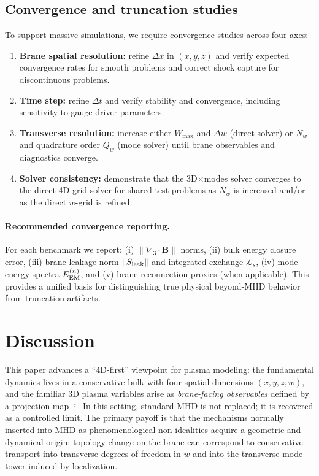 \documentclass[11pt]{article}
\newcommand{\gradthree}{\nabla_3}
\newcommand{\Proj}[1]{\overline{#1}} %
\newcommand{\B}{\mathbf{B}}
\newcommand{\Sleak}{S_{\rm leak}}
\begin{document}
\subsection{Convergence and truncation studies}
\label{sec:validation_convergence}

To support massive simulations, we require convergence studies across four axes:
\begin{enumerate}[leftmargin=1.6em]
\item \textbf{Brane spatial resolution:} refine \(\Delta x\) in \((x,y,z)\) and verify
expected convergence rates for smooth problems and correct shock capture for
discontinuous problems.
\item \textbf{Time step:} refine \(\Delta t\) and verify stability and convergence,
including sensitivity to gauge-driver parameters.
\item \textbf{Transverse resolution:} increase either \(W_{\max}\) and \(\Delta w\)
(direct solver) or \(N_w\) and quadrature order \(Q_w\) (mode solver) until brane
observables and diagnostics converge.
\item \textbf{Solver consistency:} demonstrate that the 3D\(\times\)modes solver
converges to the direct 4D-grid solver for shared test problems as \(N_w\) is
increased and/or as the direct \(w\)-grid is refined.
\end{enumerate}

\paragraph{Recommended convergence reporting.}
For each benchmark we report:
(i) \(\|\gradthree\cdot\B\|\) norms, (ii) bulk energy closure error,
(iii) brane leakage norm \(\|\Sleak\|\) and integrated exchange \(\mathcal{L}_s\),
(iv) mode-energy spectra \(E_{\rm EM}^{(n)}\), and (v) brane reconnection proxies
(when applicable). This provides a unified basis for distinguishing true physical
beyond-MHD behavior from truncation artifacts.

\section{Discussion}
\label{sec:discussion}

This paper advances a ``4D-first'' viewpoint for plasma modeling: the fundamental
dynamics lives in a conservative bulk with four spatial dimensions \((x,y,z,w)\),
and the familiar \(3\)D plasma variables arise as \emph{brane-facing observables}
defined by a projection map \(\Proj{\cdot}\). In this setting, standard MHD is not
replaced; it is recovered as a controlled limit. The primary payoff is that the
mechanisms normally inserted into MHD as phenomenological non-idealities acquire a
geometric and dynamical origin: topology change on the brane can correspond to
conservative transport into transverse degrees of freedom in \(w\) and into the
transverse mode tower induced by localization.
\end{document}
